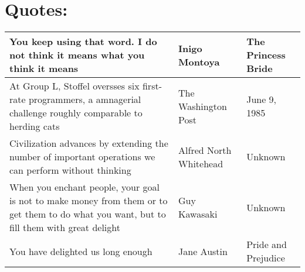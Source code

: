 \documentclass{article}
\begin{document}
\section*{Quotes:}
    \begin{tabularx}{0.8\textwidth}{
    | >{\centering\arraybackslash}X
    | >{\centering\arraybackslash}X
    | >{\centering\arraybackslash}X |}
    \hline

    You keep using that word. I do not think it means what you think it means
    & Inigo Montoya
    & The Princess Bride \\

    \hline

    At Group L, Stoffel oversses six first-rate programmers, a amnagerial challenge roughly comparable to herding cats
    & The Washington Post
    & June 9, 1985 \\

    \hline

    Civilization advances by extending the number of important operations we can perform without thinking
    & Alfred North Whitehead
    & Unknown \\

    \hline

    When you enchant people, your goal is not to make money from them or to get them to do what you want, but to fill them with great delight
    & Guy Kawasaki
    & Unknown \\

    \hline

    You have delighted us long enough
    & Jane Austin
    & Pride and Prejudice \\

    \hline
    \end{tabularx}
\end{document}
